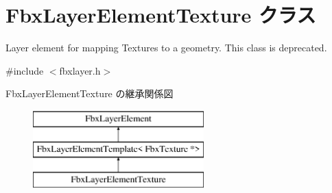 \hypertarget{class_fbx_layer_element_texture}{}\section{Fbx\+Layer\+Element\+Texture クラス}
\label{class_fbx_layer_element_texture}


Layer element for mapping Textures to a geometry. This class is deprecated.  




{\ttfamily \#include $<$fbxlayer.\+h$>$}

Fbx\+Layer\+Element\+Texture の継承関係図\begin{figure}[H]
\begin{center}
\leavevmode
\includegraphics[height=3.000000cm]{class_fbx_layer_element_texture}
\end{center}
\end{figure}
